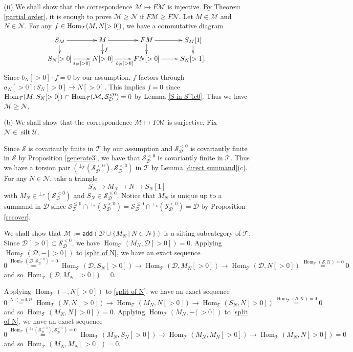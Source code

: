 \documentclass[a4paper,reqno]{amsart}
\theoremstyle{definition}
\newcommand{\DD}{{\mathcal D}}
\newcommand{\SSS}{{\mathcal S}}
\newcommand{\UU}{{\mathcal U}}
\newcommand{\TT}{{\mathcal T}}
\newcommand{\MM}{{\mathcal M}}
\newcommand{\NN}{{\mathcal N}}
\newcommand{\add}{\mathsf{add}}
\newcommand{\Hom}{\operatorname{Hom}\nolimits}
\newcommand{\silt}{\operatorname{silt}\nolimits}
\newcommand{\homo}[3]{{\rm{Hom}}_{#1}(#2, #3)} %
\begin{document}
(ii) We shall show that the correspondence $\MM\mapsto F\MM$ is injective. 
By Theorem \ref{partial order}, it is enough to prove $\MM\geq \NN$ if $F\MM\geq F\NN$. 
Let $M\in \MM$ and $N\in \NN$. 
For any $f\in \homo{\TT}{M}{N[>0]}$, we have a commutative diagram 
\[\xymatrix@R=0.4cm{
S_M \ar[r]\ar[d] & M \ar[r]\ar[d]^{f} & FM \ar[r]\ar[d] & S_M[1] \ar[d] \\
S_N[>0] \ar[r]_{a_N[>0]} & N[>0] \ar[r]_{b_N[>0]} & FN[>0] \ar[r] & S_N[>1].
}\]
Since $b_N[>0]\cdot f=0$ by our assumption, $f$ factors through $a_N[>0]: S_N[>0]\to N[>0]$. 
This implies $f=0$ since $\homo{\TT}{M}{S_N[>0]}\subset \homo{\TT}{\MM}{\SSS^{<0}_{\DD}}=0$ by Lemma \ref{S in S^le0}. 
Thus we have $\MM\geq \NN$. 

(b) We shall show that the correspondence $\MM\mapsto F\MM$ is surjective.
Fix $\NN\in\silt\UU$.

Since $\SSS$ is covariantly finite in $\TT$ by our assumption and
$\SSS^{<0}_{\DD}$ is covariantly finite in $\SSS$ by Proposition \ref{generate3}, 
we have that $\SSS^{<0}_{\DD}$ is covariantly finite in $\TT$.
Thus we have a torsion pair $({}^{\perp_{\TT}}(\SSS^{<0}_{\DD}), \SSS^{<0}_{\DD})$ in $\TT$ by Lemma \ref{direct summand}(c).
For any $N\in\NN$, take a triangle
\begin{equation}\label{split of N}
S_N\to M_N\to N\to S_N[1]
\end{equation}
with $M_N\in {}^{\perp_{\TT}}(\SSS^{<0}_{\DD})$ and $S_N\in \SSS^{\leq 0}_{\DD}$.
Notice that $M_N$ is unique up to a summand in $\DD$
since $\SSS^{\leq 0}_{\DD}\cap{}^{\perp_{\TT}}(\SSS^{<0}_{\DD})=\SSS^{\leq 0}_{\DD}\cap{}^{\perp_{\SSS}}(\SSS^{<0}_{\DD})=\DD$ by Proposition \ref{recover}.

We shall show that $\MM:=\add(\DD\cup\{M_N\ |\ N\in\NN\})$ is a silting subcategory of $\TT$.
Since $\DD[>0]\subset\SSS^{<0}_{\DD}$, we have $\Hom_{\TT}(M_N,\DD[>0])=0$.
Applying $\Hom_{\TT}(\DD,-[>0])$ to \eqref{split of N}, we have an exact sequence
\[0\stackrel{\Hom_{\TT}(\DD,\SSS^{<0}_{\DD})=0}{=}\Hom_{\TT}(\DD,S_N[>0])\to\Hom_{\TT}(\DD,M_N[>0])\to\Hom_{\TT}(\DD,N[>0])
\stackrel{\Hom_{\TT}(\SSS,\UU)=0}{=}0\]
and so $\Hom_{\TT}(\DD,M_N[>0])=0$.

Applying $\Hom_{\TT}(-,N[>0])$ to \eqref{split of N}, we have an exact sequence
\[0\stackrel{\NN\in\silt\UU}{=}\Hom_{\TT}(N,N[>0])\to\Hom_{\TT}(M_N,N[>0])\to\Hom_{\TT}(S_N,N[>0])\stackrel{\Hom_{\TT}(\SSS,\UU)=0}{=}0\]
and so $\Hom_{\TT}(M_N,N[>0])=0$.
Applying $\Hom_{\TT}(M_N,-[>0])$ to \eqref{split of N}, we have an exact sequence
\[0\stackrel{\Hom_{\TT}({}^{\perp_{\TT}}(\SSS^{<0}_{\DD}),\SSS^{<0}_{\DD})=0}{=}
\Hom_{\TT}(M_N,S_N[>0])\to\Hom_{\TT}(M_N,M_N[>0])\to\Hom_{\TT}(M_N,N[>0])=0\]
and so $\Hom_{\TT}(M_N,M_N[>0])=0$.
\end{document}
